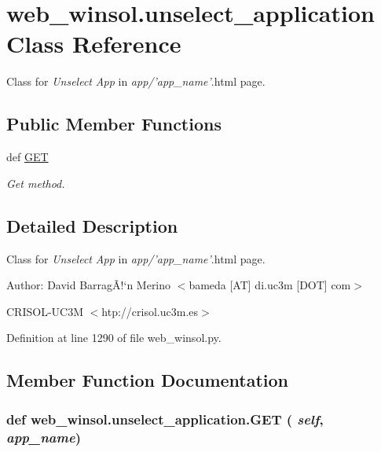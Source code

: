 \hypertarget{classweb__winsol_1_1unselect__application}{
\section{web\_\-winsol.unselect\_\-application Class Reference}
\label{classweb__winsol_1_1unselect__application}
}
Class for {\em Unselect\/} {\em App\/} in {\em app/'app\_\-name'\/}.html page.  


\subsection*{Public Member Functions}
\begin{CompactItemize}
\item 
def \hyperlink{classweb__winsol_1_1unselect__application_99772868a6144a3c1423cccfbe05260f}{GET}
\begin{CompactList}\small\item\em Get method. \item\end{CompactList}\end{CompactItemize}


\subsection{Detailed Description}
Class for {\em Unselect\/} {\em App\/} in {\em app/'app\_\-name'\/}.html page. 

\begin{Desc}
\item[Author:]David Barrag\~{A}!`n Merino $<$bameda \mbox{[}AT\mbox{]} di.uc3m \mbox{[}DOT\mbox{]} com$>$ 

CRISOL-UC3M $<$htp://crisol.uc3m.es$>$ \end{Desc}




Definition at line 1290 of file web\_\-winsol.py.

\subsection{Member Function Documentation}
\hypertarget{classweb__winsol_1_1unselect__application_99772868a6144a3c1423cccfbe05260f}{
\subsubsection[GET]{\setlength{\rightskip}{0pt plus 5cm}def web\_\-winsol.unselect\_\-application.GET ( {\em self},  {\em app\_\-name})}}
\label{classweb__winsol_1_1unselect__application_99772868a6144a3c1423cccfbe05260f}


